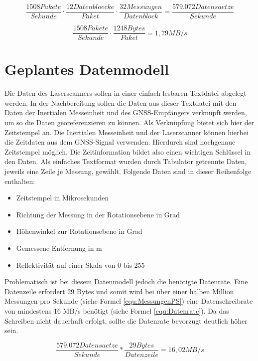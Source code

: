 \documentclass[a4paper,12pt,bibliography=totoc, listof=totoc,titlepage]{scrreprt}
\begin{document}
\begin{equation}
 \frac{1508 Pakete}{Sekunde} \cdot \frac{12 Datenbloecke}{Paket} \cdot
\frac{32 Messungen}{Datenblock} = \frac{579.072 Datensaetze}{Sekunde}
 \label{equ:MessungenPS}
\end{equation}

\begin{equation}
 \frac{1508 Pakete}{Sekunde} \cdot \frac{1248 Bytes}{Paket} = 1,79 MB/s
 \label{equ:Ausgangsrate}
\end{equation}

\section{Geplantes Datenmodell}
\label{s:datenmodell}
Die Daten des Laserscanners sollen in einer einfach lesbaren Textdatei abgelegt werden. In der Nachbereitung sollen die Daten aus dieser Textdatei mit den Daten der Inertialen Messeinheit und des GNSS-Empfängers verknüpft werden, um so die Daten georeferenzieren zu können. Als Verknüpfung bietet sich hier der Zeitstempel an. Die Inertialen Messeinheit und der Laserscanner können hierbei die Zeitdaten aus dem GNSS-Signal verwenden. Hierdurch sind hochgenaue Zeitstempel möglich. Die Zeitinformation bildet also einen wichtigen Schlüssel in den Daten. Als einfaches Textformat wurden durch Tabulator getrennte Daten, jeweils eine Zeile je Messung, gewählt. Folgende Daten sind in dieser Reihenfolge enthalten:

\begin{itemize}
 \item Zeitstempel in Mikrosekunden
 \item Richtung der Messung in der Rotationsebene in Grad
 \item Höhenwinkel zur Rotationsebene in Grad
 \item Gemessene Entfernung in m
 \item Reflektivität auf einer Skala von 0 bis 255
\end{itemize}

Problematisch ist bei diesem Datenmodell jedoch die benötigte Datenrate. Eine Datenzeile erfordert 29 Bytes und somit wird bei über einer halben Million Messungen pro Sekunde (siehe Formel \ref{equ:MessungenPS}) eine Datenschreibrate von mindestens 16 MB/s benötigt (siehe Formel \ref{equ:Datenrate}). Da das Schreiben nicht dauerhaft erfolgt, sollte die Datenrate bevorzugt deutlich höher sein.

\begin{equation}
 \frac{579.072 Datensaetze}{Sekunde} * \frac{29 Bytes}{Datenzeile} = 16,02 MB/s
\label{equ:Datenrate}
\end{equation}
\end{document}
